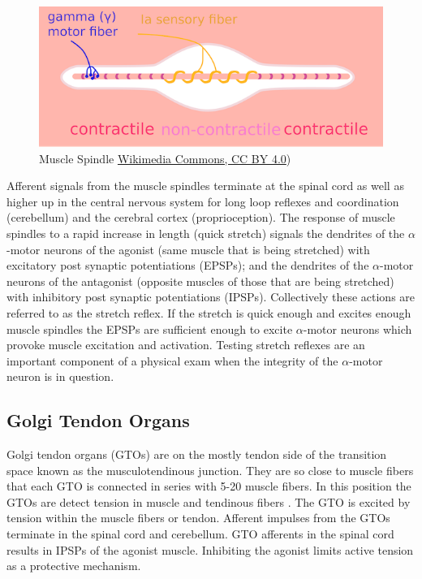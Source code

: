 \begin{figure}[!ht]
    \centering
    \includegraphics[width=1\linewidth]{./figure/MuscleSpindle.png}
    \caption{Muscle Spindle \footnotesize{\href{https://commons.wikimedia.org/wiki/File:MuscleSpindle.svg}{Wikimedia Commons, CC BY 4.0})}}
    \label{fig:MuscleSpindle}
\end{figure}

Afferent signals from the muscle spindles terminate at the spinal cord as well as higher up in the central nervous system for long loop reflexes and coordination (cerebellum) and the cerebral cortex (proprioception). The response of muscle spindles to a rapid increase in length (quick stretch) signals the dendrites of the $\alpha$-motor neurons of the agonist (same muscle that is being stretched) with excitatory post synaptic potentiations (EPSPs); and the dendrites of the $\alpha$-motor neurons of the antagonist (opposite muscles of those that are being stretched) with inhibitory post synaptic potentiations (IPSPs). Collectively these actions are referred to as the stretch reflex. If the stretch is quick enough and excites enough muscle spindles the EPSPs are sufficient enough to excite $\alpha$-motor neurons which provoke muscle excitation and activation. Testing stretch reflexes are an important component of a physical exam when the integrity of the $\alpha$-motor neuron is in question.

\subsection{Golgi Tendon Organs}

Golgi tendon organs (GTOs) are on the mostly tendon side of the transition space known as the musculotendinous junction. They are so close to muscle fibers that each GTO is connected in series with 5-20 muscle fibers. In this position the GTOs are detect tension in muscle and tendinous fibers \cite{macefield_physiological_2005}. The GTO is excited by tension within the muscle fibers or tendon. Afferent impulses from the GTOs terminate in the spinal cord and cerebellum. GTO afferents in the spinal cord results in IPSPs of the agonist muscle. Inhibiting the agonist limits active tension as a protective mechanism.


